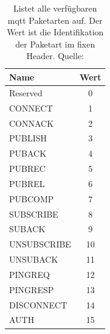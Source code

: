 \begin{table}[h!]
\centering
\renewcommand{\arraystretch}{1.5}
\begin{tabular}{|l|c|}
    \hline
    \textbf{Name} & \textbf{Wert} \\
    \hline
    \hline
    Reserved & 0 \\
    \hline
    CONNECT & 1 \\
    \hline
    CONNACK & 2 \\
    \hline
    PUBLISH & 3 \\
    \hline
    PUBACK & 4 \\
    \hline
    PUBREC & 5 \\
    \hline
    PUBREL & 6 \\
    \hline
    PUBCOMP & 7 \\
    \hline
    SUBSCRIBE & 8 \\
    \hline
    SUBACK & 9 \\
    \hline
    UNSUBSCRIBE & 10 \\
    \hline
    UNSUBACK & 11 \\
    \hline
    PINGREQ & 12 \\
    \hline
    PINGRESP & 13 \\
    \hline
    DISCONNECT & 14 \\
    \hline
    AUTH & 15 \\
    \hline
\end{tabular}
\caption{Listet alle verfügbaren \ac{mqtt} Paketarten auf. Der Wert ist die Identifikation der Paketart im fixen Header. Quelle: \cite{mqtt5Specification}}
\label{table:mqtt-packet-types}
\end{table}
\newpage

